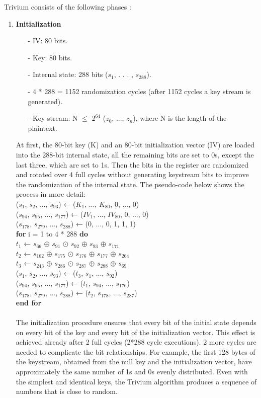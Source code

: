 Trivium consists of the following phases \cite{canniere2008trivium}:
\begin{enumerate}
	\item \textbf{Initialization}
	\begin{itemize}
		\setlength\itemsep{0.1em}
		\item[-] IV: 80 bits.
		\item[-] Key: 80 bits.
		\item[-] Internal state: 288 bits ($s_1$, . . . , $s_{288}$). 
		\item[-] 4 * 288 = 1152 randomization cycles (after 1152 cycles a key stream is generated).
		\item[-] Key stream: N $\leq$ $2^{64}$ ($z_0$, ..., $z_n$), where N is the length of the plaintext.
	\end{itemize}
	At first, the  80-bit key (K) and an 80-bit initialization vector (IV) are loaded into the 288-bit internal state, all the remaining bits are set to 0s, except the last three, which are set to 1s. Then the bits in the register are randomized and rotated over 4 full cycles without generating keystream bits to improve the randomization of the internal state.
	The pseudo-code below shows the process in more detail:
	\vspace{0.5em}
	\\
	{\selectfont
		($s_1$, $s_2$, ..., $s_93$) ← ($K_1$, ..., $K_{80}$, 0, ..., 0)\\
		($s_{94}$, $s_{95}$, ..., $s_{177}$) ← ($IV_1$, ..., $IV_{80}$, 0, ..., 0)\\
		($s_{178}$, $s_{279}$, ..., $s_{288}$) ← (0, ..., 0, 1, 1, 1)\\
		\textbf{for} i = 1 to 4 * 288 \textbf{do} \\
		$t_1$ ← $s_{66}$ $\oplus$ $s_{91}$ $\odot$ $s_{92}$ $\oplus$ $s_{93}$ $\oplus$ $s_{171}$\\
		$t_2$ ← $s_{162}$ $\oplus$ $s_{175}$ $\odot$ $s_{176}$ $\oplus$ $s_{177}$ $\oplus$ $s_{264}$\\
		$t_3$ ← $s_{243}$ $\oplus$ $s_{286}$ $\odot$ $s_{287}$ $\oplus$ $s_{288}$ $\oplus$ $s_{69}$\\
		($s_1$, $s_2$, ..., $s_{93}$) ← ($t_3$, $s_1$, ..., $s_{92}$)\\
		($s_{94}$, $s_{95}$, ..., $s_{177}$) ← ($t_1$, $s_{94}$, ..., $s_{176}$)\\
		($s_{178}$, $s_{279}$, ..., $s_{288}$) ← ($t_2$, $s_{178}$, ..., $s_{287}$)\\
		\textbf{end for}\\
	}
	\\
	The initialization procedure ensures that every bit of the initial state depends on every bit of the key and every bit of the initialization vector. This effect is achieved already after 2 full cycles (2*288 cycle executions). 2 more cycles are needed to complicate the bit relationships. For example, the first 128 bytes of the keystream, obtained from the null key and the initialization vector, have approximately the same number of 1s and 0s evenly distributed. Even with the simplest and identical keys, the Trivium algorithm produces a sequence of numbers that is close to random.
	

\end{enumerate}
